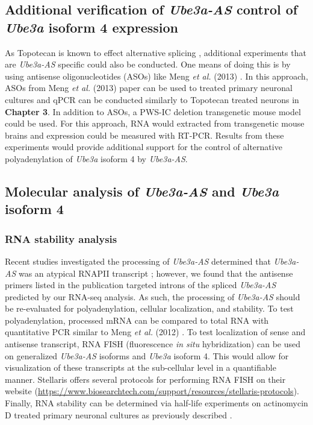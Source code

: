 \subsection{Additional verification of \textit{Ube3a-AS} control of \textit{Ube3a} isoform 4 expression}
As Topotecan is known to effect alternative splicing \cite{Shkreta2008,Powell2013b}, additional experiments that are \textit{Ube3a-AS} specific could also be conducted. One means of doing this is by using antisense oligonucleotides (ASOs) like Meng \textit{et al.} (2013) \cite{Meng2013}. In this approach, ASOs from Meng \textit{et al.} (2013) paper can be used to treated primary neuronal cultures and qPCR can be conducted similarly to Topotecan treated neurons in \textbf{Chapter 3}. In addition to ASOs, a PWS-IC deletion transgenetic mouse model could be used. For this approach, RNA would extracted from transgenetic mouse brains and expression could be measured with RT-PCR. Results from these experiments would provide additional support for the control of alternative polyadenylation of \textit{Ube3a} isoform 4 by \textit{Ube3a-AS}.

\subsection{Molecular analysis of \textit{Ube3a-AS} and \textit{Ube3a} isoform 4}
\subsubsection{RNA stability analysis}
Recent studies investigated the processing of \textit{Ube3a-AS} determined that \textit{Ube3a-AS} was an atypical RNAPII transcript \cite{Meng2012}; however, we found that the antisense primers listed in the publication targeted introns of the spliced \textit{Ube3a-AS} predicted by our RNA-seq analysis. As such, the processing of \textit{Ube3a-AS} should be re-evaluated for polyadenylation, cellular localization, and stability.
To test polyadenylation, processed mRNA can be compared to total RNA with quantitative PCR similar to Meng \textit{et al.} (2012) \cite{Meng2012}. To test localization of sense and antisense transcript, RNA FISH (fluorescence \textit{in situ} hybridization) can be used on generalized \textit{Ube3a-AS} isoforms and \textit{Ube3a} isoform 4. This would allow for visualization of these transcripts at the sub-cellular level in a quantifiable manner. Stellaris offers several protocols for performing RNA FISH on their website (\url{https://www.biosearchtech.com/support/resources/stellaris-protocols}).
Finally, RNA stability can be determined via half-life experiments on actinomycin D treated primary neuronal cultures as previously described \cite{Meng2012}.

